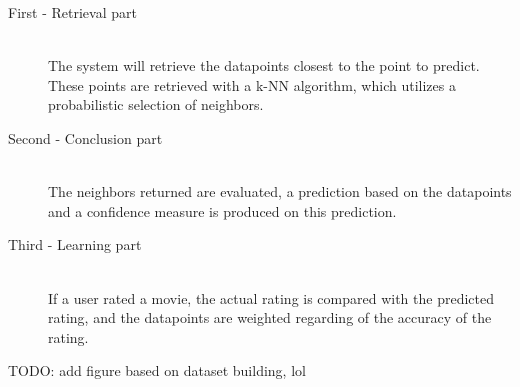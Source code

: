 \begin{description}
    \item[First - Retrieval part] \hfill \\
    The system will retrieve the datapoints closest to the point to predict. These points are retrieved with a k-NN algorithm, which utilizes a probabilistic selection of neighbors.

    \item[Second - Conclusion part] \hfill \\
    The neighbors returned are evaluated, a prediction based on the datapoints and a confidence measure is produced on this prediction.

    \item[Third - Learning part] \hfill \\
    If a user rated a movie, the actual rating is compared with the predicted rating, and the datapoints are weighted regarding of the accuracy of the rating.
\end{description}

TODO: add figure based on dataset building, lol
